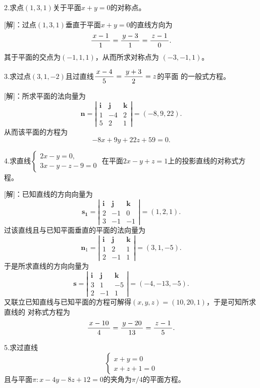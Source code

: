 \bs

2.求点$(1,3,1)$关于平面$x+y=0$的对称点。

[解]：过点$(1,3,1)$垂直于平面$x+y=0$的直线方向为
$$\displaystyle\frac{\,{x-1}\,}{\,{1}\,}=\displaystyle\frac{\,{y-3}\,}{\,{1}\,}=\displaystyle\frac{\,{z-1}\,}{\,{0}\,}.$$
其于平面的交点为$(-1,1,1)$，从而所求对称点为
$(-3,-1,1)$。\fin

\bs

3.求过点$(3,1,-2)$且过直线$\displaystyle\frac{\,{x-4}\,}{\,{5}\,}=\displaystyle\frac{\,{y+3}\,}{\,{2}\,}=z$的平面
的一般式方程。

[解]：所求平面的法向量为
$$\bm{n}=\left|\begin{array}{ccc}
	\bm{i} & \bm{j} & \bm{k}\\
	1 & -4 & 2 \\
	5 & 2 & 1
\end{array}\right|=(-8,9,22).$$
从而该平面的方程为
$$-8x+9y+22z+59=0.$$
\fin

\bs

4.求直线$\left\{\begin{array}{l}
  	2x-y=0, \\ 3x-y-z-9=0
  \end{array}\right.$
  在平面$2x-y+z=1$上的投影直线的对称式方程。

[解]：已知直线的方向向量为
$$\bm{s_1}=\left|\begin{array}{ccc}
	\bm{i} & \bm{j} & \bm{k}\\
	2 & -1 & 0 \\
	3 & -1 & -1
\end{array}\right|=(1,2,1).$$
过该直线且与已知平面垂直的平面的法向量为
$$\bm{n}_1=\left|\begin{array}{ccc}
	\bm{i} & \bm{j} & \bm{k}\\
	1 & 2 & 1 \\
	2 & -1 & 1
\end{array}\right|=(3,1,-5).$$
于是所求直线的方向向量为
$$\bm{s}=\left|\begin{array}{ccc}
	\bm{i} & \bm{j} & \bm{k}\\
	3 & 1 & -5 \\
	2 & -1 & 1
\end{array}\right|=(-4,-13,-5).$$
又联立已知直线与已知平面的方程可解得$(x,y,z)=(10,20,1)$，于是可知所求直线的
对称式方程为
$$\displaystyle\frac{\,{x-10}\,}{\,{4}\,}=\displaystyle\frac{\,{y-20}\,}{\,{13}\,}=\displaystyle\frac{\,{z-1}\,}{\,{5}\,}.$$
\fin

\bs

5.求过直线
$$\left\{\begin{array}{l}
	x+y=0\\
	x+z+1=0
\end{array}\right.$$
且与平面$\pi:x-4y-8z+12=0$的夹角为$\pi/4$的平面方程。

